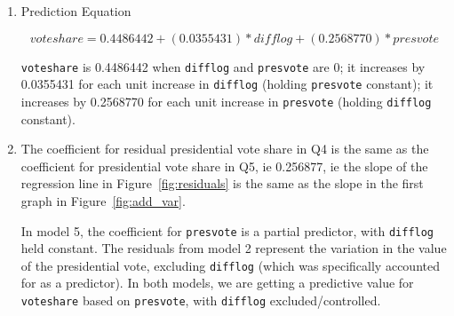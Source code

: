 \documentclass[12pt,letterpaper]{article}
\begin{document}
\begin{enumerate}

		\item Prediction Equation
  
      \[voteshare = 0.4486442 + (0.0355431) * difflog + (0.2568770) * presvote\]

      \texttt{voteshare} is 0.4486442 when \texttt{difflog} and \texttt{presvote} are 0; 
        it increases by 0.0355431 for each unit increase in \texttt{difflog} 
        (holding \texttt{presvote} constant); 
        it increases by 0.2568770 for each unit increase in \texttt{presvote}
           (holding \texttt{difflog} constant).

		\item %
    The coefficient for residual presidential vote share in Q4 is the same as the coefficient for presidential vote share in Q5, ie 0.256877, ie the slope of the regression line in Figure~\ref{fig:residuals} is the same as the slope in the first graph in Figure~\ref{fig:add_var}.

    In model 5, the coefficient for \texttt{presvote} is a partial predictor, with \texttt{difflog} 
    held constant.  The residuals from model 2 represent the variation in the value of the presidential vote, excluding \texttt{difflog} (which was specifically accounted for as a predictor).  In both models, we are getting a predictive value for \texttt{voteshare} based on \texttt{presvote}, with \texttt{difflog} excluded/controlled.

	\end{enumerate}
\end{document}
